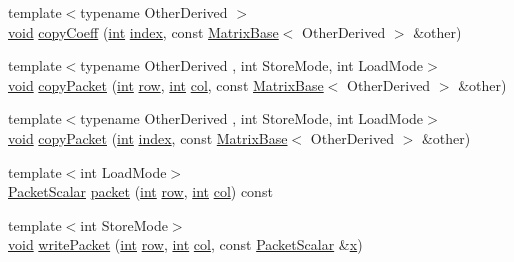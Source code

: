 \begin{DoxyCompactItemize}
\item 
{\footnotesize template$<$typename Other\-Derived $>$ }\\\hyperlink{group___u_a_v_objects_plugin_ga444cf2ff3f0ecbe028adce838d373f5c}{void} \hyperlink{class_matrix_base_aca65cbe24382915de7b5b5695471a45a}{copy\-Coeff} (\hyperlink{ioapi_8h_a787fa3cf048117ba7123753c1e74fcd6}{int} \hyperlink{glext_8h_ab47dd9958bcadea08866b42bf358e95e}{index}, const \hyperlink{class_matrix_base}{Matrix\-Base}$<$ Other\-Derived $>$ \&other)
\item 
{\footnotesize template$<$typename Other\-Derived , int Store\-Mode, int Load\-Mode$>$ }\\\hyperlink{group___u_a_v_objects_plugin_ga444cf2ff3f0ecbe028adce838d373f5c}{void} \hyperlink{class_matrix_base_a73c8b30f3388d84431e30e749bb56b38}{copy\-Packet} (\hyperlink{ioapi_8h_a787fa3cf048117ba7123753c1e74fcd6}{int} \hyperlink{glext_8h_a11b277b422822f784ee248b43eee3e1e}{row}, \hyperlink{ioapi_8h_a787fa3cf048117ba7123753c1e74fcd6}{int} \hyperlink{class_matrix_base_ae3c94b0f25b4273c7a8125169bdf60e0}{col}, const \hyperlink{class_matrix_base}{Matrix\-Base}$<$ Other\-Derived $>$ \&other)
\item 
{\footnotesize template$<$typename Other\-Derived , int Store\-Mode, int Load\-Mode$>$ }\\\hyperlink{group___u_a_v_objects_plugin_ga444cf2ff3f0ecbe028adce838d373f5c}{void} \hyperlink{class_matrix_base_aac8f31860215c9c56629ab1d0deb44e8}{copy\-Packet} (\hyperlink{ioapi_8h_a787fa3cf048117ba7123753c1e74fcd6}{int} \hyperlink{glext_8h_ab47dd9958bcadea08866b42bf358e95e}{index}, const \hyperlink{class_matrix_base}{Matrix\-Base}$<$ Other\-Derived $>$ \&other)
\item 
{\footnotesize template$<$int Load\-Mode$>$ }\\\hyperlink{class_matrix_base_a58f32cd6a06433ee7a60efa03e99183a}{Packet\-Scalar} \hyperlink{class_matrix_base_ad8953cad178367ffaa242e10436f952a}{packet} (\hyperlink{ioapi_8h_a787fa3cf048117ba7123753c1e74fcd6}{int} \hyperlink{glext_8h_a11b277b422822f784ee248b43eee3e1e}{row}, \hyperlink{ioapi_8h_a787fa3cf048117ba7123753c1e74fcd6}{int} \hyperlink{class_matrix_base_ae3c94b0f25b4273c7a8125169bdf60e0}{col}) const 
\item 
{\footnotesize template$<$int Store\-Mode$>$ }\\\hyperlink{group___u_a_v_objects_plugin_ga444cf2ff3f0ecbe028adce838d373f5c}{void} \hyperlink{class_matrix_base_a279cd802bd5f8e646dcd86f9e81e87d6}{write\-Packet} (\hyperlink{ioapi_8h_a787fa3cf048117ba7123753c1e74fcd6}{int} \hyperlink{glext_8h_a11b277b422822f784ee248b43eee3e1e}{row}, \hyperlink{ioapi_8h_a787fa3cf048117ba7123753c1e74fcd6}{int} \hyperlink{class_matrix_base_ae3c94b0f25b4273c7a8125169bdf60e0}{col}, const \hyperlink{class_matrix_base_a58f32cd6a06433ee7a60efa03e99183a}{Packet\-Scalar} \&\hyperlink{glext_8h_a1db9d104e3c2128177f26aff7b46982f}{x})

\end{DoxyCompactItemize}
